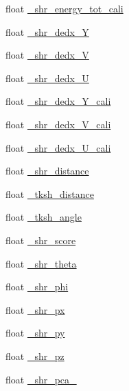 \begin{DoxyCompactItemize}
float \hyperlink{classselection_1_1CC0piNpSelection_aae69f88600d31bb3456808268fb63c1c}{\-\_\-shr\-\_\-energy\-\_\-tot\-\_\-cali}
\item 
float \hyperlink{classselection_1_1CC0piNpSelection_a1af96c31bd3afe4b111f429927bbff1c}{\-\_\-shr\-\_\-dedx\-\_\-\-Y}
\item 
float \hyperlink{classselection_1_1CC0piNpSelection_a392211f6d023d92bf113c20098c5e7fe}{\-\_\-shr\-\_\-dedx\-\_\-\-V}
\item 
float \hyperlink{classselection_1_1CC0piNpSelection_ada2f72c2f814e7d06c24a50ff5ad4fcc}{\-\_\-shr\-\_\-dedx\-\_\-\-U}
\item 
float \hyperlink{classselection_1_1CC0piNpSelection_a114f4276a8931d33d8f77fede58398fa}{\-\_\-shr\-\_\-dedx\-\_\-\-Y\-\_\-cali}
\item 
float \hyperlink{classselection_1_1CC0piNpSelection_a0ef852fb0ecd8a3b6f871ed765be12da}{\-\_\-shr\-\_\-dedx\-\_\-\-V\-\_\-cali}
\item 
float \hyperlink{classselection_1_1CC0piNpSelection_a7c90820db5398c179aef3186ab11e521}{\-\_\-shr\-\_\-dedx\-\_\-\-U\-\_\-cali}
\item 
float \hyperlink{classselection_1_1CC0piNpSelection_a20705dc212e16009a0ce4ace27d54af7}{\-\_\-shr\-\_\-distance}
\item 
float \hyperlink{classselection_1_1CC0piNpSelection_a73d772bb569336b56a3f14cee752e2f3}{\-\_\-tksh\-\_\-distance}
\item 
float \hyperlink{classselection_1_1CC0piNpSelection_a959adc6093ff4d2730dac8f75dd1245c}{\-\_\-tksh\-\_\-angle}
\item 
float \hyperlink{classselection_1_1CC0piNpSelection_a9033ad097ef1b7a4e10b2b872b82f068}{\-\_\-shr\-\_\-score}
\item 
float \hyperlink{classselection_1_1CC0piNpSelection_a624a38f7c8d33320df92e610fd0e16ee}{\-\_\-shr\-\_\-theta}
\item 
float \hyperlink{classselection_1_1CC0piNpSelection_a8706a83b3dc2e2c3857ada556392f16f}{\-\_\-shr\-\_\-phi}
\item 
float \hyperlink{classselection_1_1CC0piNpSelection_a52e2043c82f5de7f93ac9bad63563f18}{\-\_\-shr\-\_\-px}
\item 
float \hyperlink{classselection_1_1CC0piNpSelection_a436dd7081c84003dabb595289d745111}{\-\_\-shr\-\_\-py}
\item 
float \hyperlink{classselection_1_1CC0piNpSelection_a769319ad32b6ce49c7a5283b246303fa}{\-\_\-shr\-\_\-pz}
\item 
float \hyperlink{classselection_1_1CC0piNpSelection_a47b08d4ae98f51032f431873321914a5}{\-\_\-shr\-\_\-pca\-\_}

\end{DoxyCompactItemize}
